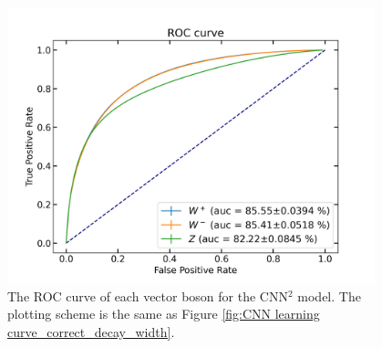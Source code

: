 \documentclass[12pt]{article}
\begin{document}
		\begin{figure}[htpb]
			\centering
			\includegraphics[width=0.95\textwidth]{CNNsq_roc_auc_correct_width.png}
			\caption{The ROC curve of each vector boson for the CNN$^2$ model. The plotting scheme is the same as Figure \ref{fig:CNN learning curve_correct_decay_width}.}
			\label{fig:CNNsq roc curve_correct_decay_width}
		\end{figure}

\end{document}
